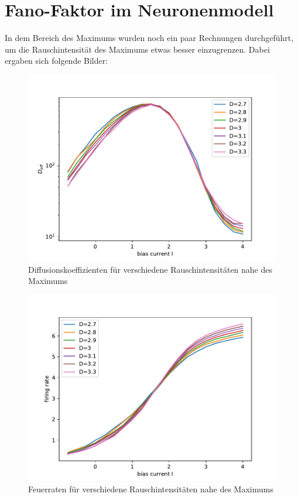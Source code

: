 \documentclass[12pt,a4paper]{article}
\begin{document}

\thispagestyle{empty}
\newpage
\tableofcontents
\thispagestyle{empty}
\newpage
{}

\section{Fano-Faktor im Neuronenmodell}
In dem Bereich des Maximums wurden noch ein paar Rechnungen durchgeführt, um die Rauschintensität des Maximums etwas besser einzugrenzen. Dabei ergaben sich folgende Bilder:
\begin{figure}[H]
	\centering
	\includegraphics[scale=0.9]{dneurpmax.pdf} 
	\caption{Diffusionskoeffizienten für verschiedene Rauschintensitäten nahe des Maximums}
	\label{dnpmax}
\end{figure} 
\begin{figure}[H]
	\centering
	\includegraphics[scale=0.9]{gneurpmax.pdf} 
	\caption{Feuerraten für verschiedene Rauschintensitäten nahe des Maximums}
	\label{gnpmax}
\end{figure} 
\end{document}
